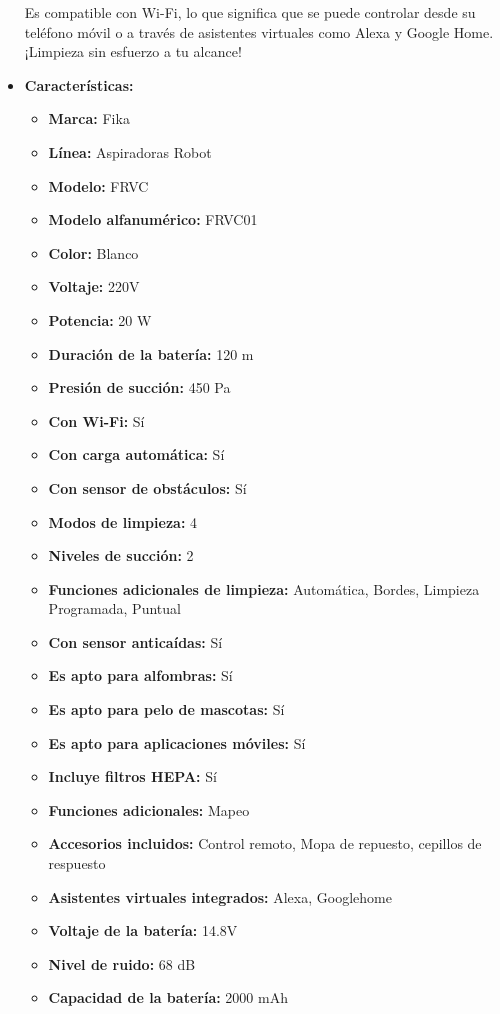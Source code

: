 \documentclass{article}
\begin{document}
\begin{adjustwidth}{2em}{}
\begin{itemize}
Es compatible con Wi-Fi, lo que significa que se puede controlar desde su teléfono móvil o a través de asistentes virtuales como Alexa y Google Home. ¡Limpieza sin esfuerzo a tu alcance!
    \item \textbf{Características:} 
    \begin{itemize}
        \item \textbf {Marca:} Fika
    \item \textbf {Línea:} Aspiradoras Robot
    \item \textbf {Modelo:} FRVC
    \item \textbf {Modelo alfanumérico:} FRVC01
    \item \textbf {Color:} Blanco
    \item \textbf {Voltaje:} 220V
    \item \textbf {Potencia:} 20 W
    \item \textbf {Duración de la batería:} 120 m
    \item \textbf {Presión de succión:} 450 Pa
    \item \textbf {Con Wi-Fi:} Sí
    \item \textbf {Con carga automática:} Sí
    \item \textbf {Con sensor de obstáculos:} Sí
    \item \textbf {Modos de limpieza:} 4
    \item \textbf {Niveles de succión:} 2
    \item \textbf {Funciones adicionales de limpieza:} Automática, Bordes, Limpieza Programada, Puntual
    \item \textbf {Con sensor anticaídas:} Sí
    \item \textbf {Es apto para alfombras:} Sí
    \item \textbf {Es apto para pelo de mascotas:} Sí
    \item \textbf {Es apto para aplicaciones móviles:} Sí
    \item \textbf {Incluye filtros HEPA:} Sí
    \item \textbf {Funciones adicionales:} Mapeo
    \item \textbf {Accesorios incluidos:} Control remoto, Mopa de repuesto, cepillos de respuesto
    \item \textbf {Asistentes virtuales integrados:} Alexa, Googlehome
    \item \textbf {Voltaje de la batería:} 14.8V
    \item \textbf {Nivel de ruido:} 68 dB
    \item \textbf {Capacidad de la batería:} 2000 mAh

\end{itemize}
\end{itemize}
\end{adjustwidth}
\end{document}
